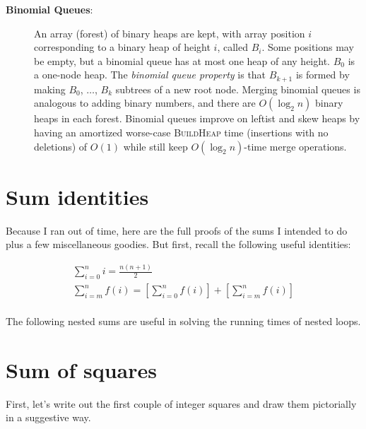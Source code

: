 \documentclass{article}[10pt,letterpaper]
\begin{document}
\begin{description}
\item[\textbf{Binomial Queues}:] An array (forest) of binary heaps are
kept, with array position $i$ corresponding to a binary heap of height $i$,
called $B_i$. Some positions may be empty, but a binomial queue has at most
one heap of any height. $B_0$ is a one-node heap.
The \textit{binomial queue property}
is that $B_{k+1}$ is formed by making $B_0$, $\ldots$, $B_k$ subtrees of
a new root node. Merging binomial queues is analogous to adding binary
numbers, and there are $O(\log_2{n})$ binary heaps in each forest.
Binomial queues improve on leftist and skew heaps by having an amortized
worse-case \textsc{BuildHeap} time (insertions with no deletions) of $O(1)$
while still keep $O(\log_2{n})$-time merge operations.

\end{description}

\section{Sum identities}

Because I ran out of time, here are the full proofs of the sums I
intended to do plus a few miscellaneous goodies.
But first, recall the following useful identities:

\begin{eqnarray}
\sum_{i=0}^n i = \frac{n(n+1)}{2}\\
\sum_{i=m}^n f(i) = \left[\sum_{i=0}^n f(i)\right] + \left[\sum_{i=m}^n f(i)\right]\\
\end{eqnarray}

The following nested sums are useful in
solving the running times of nested loops.

\section{Sum of squares}

First, let's write out the first couple of integer squares and draw
them pictorially in a suggestive way.
\end{document}
